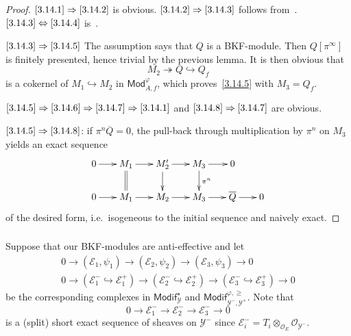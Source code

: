 \documentclass[11pt]{article}
\theoremstyle{definition}
\numberwithin{equation}{section}
\numberwithin{figure}{section}
\numberwithin{table}{section}
\newcommand{\Mod}{\mathsf{Mod}}
\newcommand{\Modif}{\mathsf{Modif}}
\begin{document}
\begin{proof}
$\eqref{3.14.1}\Rightarrow\eqref{3.14.2}$ is obvious. $\eqref{3.14.2}\Rightarrow\eqref{3.14.3}$ follows from~\cite[4.19]{BaMoSc16}. $\eqref{3.14.3}\Leftrightarrow\eqref{3.14.4}$ is~\cite[4.12]{BaMoSc16}.

$\eqref{3.14.3}\Rightarrow\eqref{3.14.5}$ The assumption says that $Q$ is a BKF-module. Then $Q[\pi^{\infty}]$ is finitely presented, hence trivial by the previous lemma. It is then obvious that
\[
M_{2}\twoheadrightarrow Q\hookrightarrow Q_{f}
\]
is a cokernel of $M_{1}\hookrightarrow M_{2}$ in $\Mod_{A,f}^{\varphi}$, which proves~\eqref{3.14.5} with $M_{3}=Q_{f}$.

$\eqref{3.14.5}\Rightarrow\eqref{3.14.6}\Rightarrow\eqref{3.14.7}\Rightarrow\eqref{3.14.1}$ and $\eqref{3.14.8}\Rightarrow\eqref{3.14.7}$ are obvious.

$\eqref{3.14.5}\Rightarrow\eqref{3.14.8}$: if $\pi^{n}\overline{Q}=0$, the pull-back through multiplication by $\pi^{n}$ on $M_{3}$ yields an exact sequence
\[
\xymatrix@C=1.5pc@R=1.5pc{
0 \ar[r]& M_{1} \ar[r]\ar@{=}[d]& M_{2}^{\prime} \ar[r]\ar[d]& M_{3} \ar[r]\ar[d]^{\pi^n}& 0\\
0 \ar[r]& M_{1} \ar[r]& M_{2} \ar[r]& M_{3} \ar[r]& \overline{Q} \ar[r]& 0
}
\]
of the desired form, i.e.~isogeneous to the initial sequence and naively exact.
\end{proof}

\subsubsection{}

Suppose that our BKF-modules are anti-effective and let
\begin{gather*}
0\rightarrow(\mathscr{E}_{1},\psi_{1})\rightarrow(\mathscr{E}_{2},\psi_{2})\rightarrow(\mathscr{E}_{3},\psi_{3})\rightarrow0
\\
0\rightarrow(\mathscr{E}_{1}^{-}\hookrightarrow\mathscr{E}_{1}^{+})\rightarrow(\mathscr{E}_{2}^{-}\hookrightarrow\mathscr{E}_{2}^{+})\rightarrow(\mathscr{E}_{3}^{-}\hookrightarrow\mathscr{E}_{3}^{+})\rightarrow0
\end{gather*}
be the corresponding complexes in $\Modif_{\mathscr{Y}}^{\star}$ and $\Modif_{\mathscr{Y}^{-},\mathscr{Y}^{+}}^{\varphi,\geq}$. Note that
\[
0\rightarrow\mathscr{E}_{1}^{-}\rightarrow\mathscr{E}_{2}^{-}\rightarrow\mathscr{E}_{3}^{-}\rightarrow0
\]
is a (split) short exact sequence of sheaves on $\mathscr{Y}^{-}$ since $\mathscr{E}_{i}^{-}=T_{i}\otimes_{\mathcal{O}_{E}}\mathscr{O}_{\mathscr{Y}^{-}}$.
\end{document}
